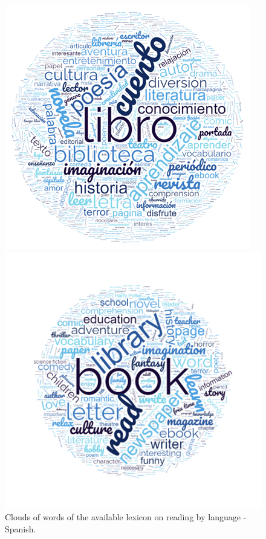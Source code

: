\documentclass[english]{textolivre}
\begin{document}
\begin{figure}[htbp]
 \centering
 \begin{minipage}{.30\textwidth}
 \includegraphics[width=\textwidth]{Fig2.png}
 \caption{Clouds of words of the available lexicon on reading by language - Spanish.}
 \label{fig2}
 \end{minipage}%
 \qquad
 \begin{minipage}{0.30\textwidth}
 \includegraphics[width=\textwidth]{Fig3.png}

\end{minipage}
\end{figure}
\end{document}
